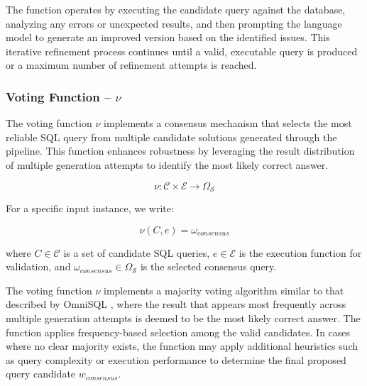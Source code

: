 The function operates by executing the candidate query against the database, analyzing
any errors or unexpected results, and then prompting the language model to generate
an improved version based on the identified issues. This iterative refinement
process continues until a valid, executable query is produced or a maximum number
of refinement attempts is reached.

\subsubsection{Voting Function – $\nu$}\label{design:voting-function}

The voting function $\nu$ implements a consensus mechanism that selects the most
reliable SQL query from multiple candidate solutions generated through the pipeline.
This function enhances robustness by leveraging the result distribution of multiple
generation attempts to identify the most likely correct answer.

$$
\nu: \mathcal{C} \times \mathcal{E} \rightarrow \Omega_{\mathcal{S}}
$$

\vspace{0.5em}

For a specific input instance, we write:

$$
\nu(C, e) = \omega_{consensus}
$$

where $C \in \mathcal{C}$ is a set of candidate SQL queries, $e \in \mathcal{E}$ is
the execution function for validation, and $\omega_{consensus} \in \Omega_{\mathcal{S}}$
is the selected consensus query.

\vspace{0.5em}

The voting function $\nu$ implements a majority voting algorithm similar to that
described by OmniSQL \citep{OmniSQL}, where the result that appears most frequently
across multiple generation attempts is deemed to be the most likely correct answer.
The function applies frequency-based selection among the valid candidates. In cases where
no clear majority exists, the function may apply additional heuristics such as query
complexity or execution performance to determine the final proposed query candidate $w_{consensus}$.
